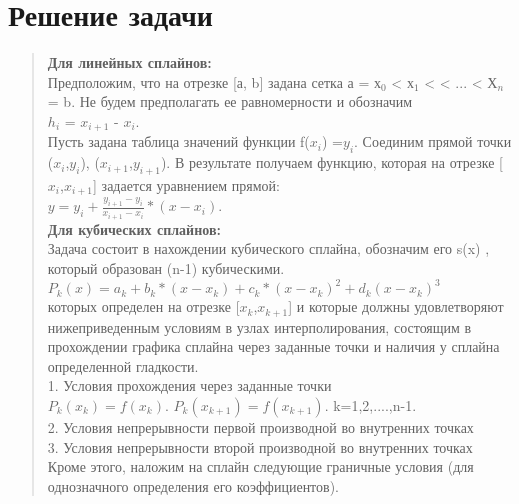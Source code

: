 \documentclass{article}
\begin{document}
\section{Решение задачи}
\begin{quotation}
	
\textbf{Для линейных сплайнов:}\\

	Предположим, что на отрезке [а, b] задана сетка а = $х_0$ < $х_1$ < < ... < $Х_n$ = b. Не будем предполагать ее равномерности и обозначим\\
$h_i$ = $x_{i+1}$ - $x_i$.\\

	Пусть задана таблица значений функции f($x_i$) =$y_i$. Соединим прямой точки ($x_i$,$y_i$), ($x_{i+1}$,$y_{i+1}$). В результате получаем функцию, которая на отрезке [$x_i$,$x_{i+1}$] задается уравнением прямой:\\
	
	\textbf{$y=y_i+\frac{y_{i+1}-y_i}{x_{i+1}-x_i}*(x-x_i)$}.\\
	
	\textbf{Для кубических сплайнов:}\\
	
	Задача состоит в нахождении кубического сплайна, обозначим его s(x) , который образован (n-1) кубическими.\\
	
	\textbf{$P_k(x)=a_k+b_k*(x-x_k)+c_k*(x-x_k)^2+d_k(x-x_k)^3$}\\

которых определен на отрезке [$x_k$,$x_{k+1}$] и которые должны удовлетворяют нижеприведенным условиям в узлах интерполирования, состоящим в прохождении графика сплайна через заданные точки и наличия у сплайна определенной гладкости.\\
	
1. Условия прохождения через заданные точки\\

\textbf{$P_k(x_k)=f(x_k)$}.  \textbf{$P_k(x_{k+1})=f(x_{k+1})$}. k=1,2,....,n-1.\\

2. Условия непрерывности первой производной во внутренних точках\\

3. Условия непрерывности второй производной во внутренних точках\\

 Кроме этого, наложим на сплайн следующие граничные условия (для однозначного определения его коэффициентов).\\


\end{quotation}
\end{document}
